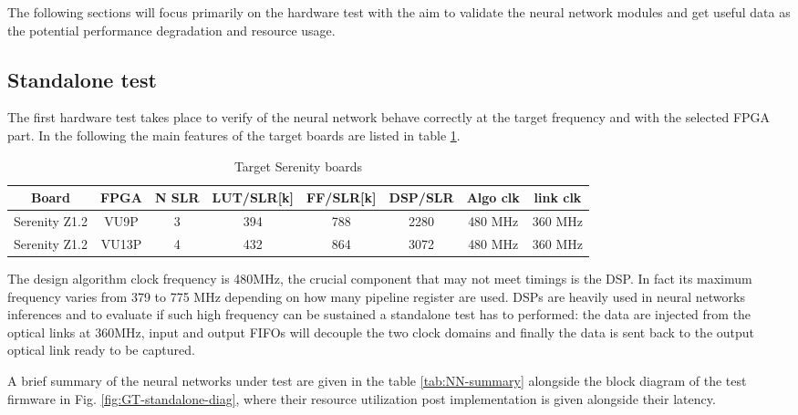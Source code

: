 \documentclass[../../main.tex]{subfiles}
\begin{document}
The following sections will focus primarily on the hardware test with the aim to validate the neural network modules and get useful data as the potential performance degradation and resource usage.

\clearpage  
\subsection{Standalone test}
\label{sec:P2GT_test_st}
The first hardware test takes place to verify of the neural network behave correctly at the target frequency and with the selected FPGA part. In the following the main features of the target boards are listed in table \ref{tab:serenity_boards}.  

\begin{center}
    \begin{table}[h]
    \begin{tabular}{|c|c|c|c|c|c|c|c|}
        \hline
        Board & FPGA & N SLR & LUT/SLR[k] & FF/SLR[k] & DSP/SLR & Algo clk & link clk \\ 
        \hline \hline
        Serenity Z1.2 & VU9P  & 3  & 394 & 788 & 2280 & 480 MHz & 360 MHz \\
        Serenity Z1.2 & VU13P & 4  & 432 & 864 & 3072 & 480 MHz & 360 MHz \\
        \hline
    \end{tabular}
    \caption{Target Serenity boards}
    \label{tab:serenity_boards}
    \end{table}
\end{center}
  
  
The design algorithm clock frequency is 480MHz, the crucial component that may not meet timings is the DSP. In fact its maximum frequency varies from 379 to 775 MHz\cite{DSP-ch} depending on how many pipeline register are used.  
DSPs are heavily used in neural networks inferences and to evaluate if such high frequency can be sustained a standalone test has to performed: the data are injected from the optical links at 360MHz, input and output FIFOs will decouple the two clock domains and finally the data is sent back to the output optical link ready to be captured.   

A brief summary of the neural networks under test are given in the table \ref{tab:NN-summary} alongside the block diagram of the test firmware in Fig. \ref{fig:GT-standalone-diag}, where their resource utilization post implementation is given alongside their latency.
\end{document}
